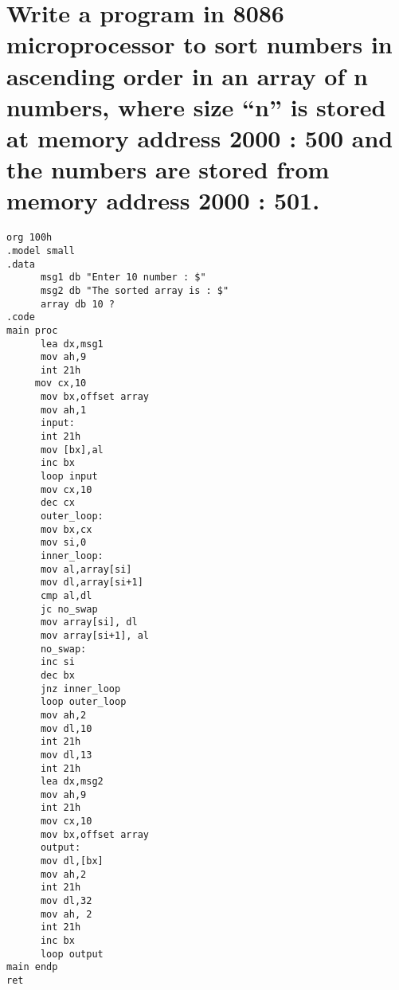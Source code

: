 \documentclass{article}
\begin{document}
\section{Write a program in 8086 microprocessor to sort numbers in ascending order in an
array of n numbers, where size “n” is stored at memory address 2000 : 500 and
the numbers are stored from memory address 2000 : 501.} 

\begin{lstlisting}[style=asmStyle]
org 100h
.model small
.data
      msg1 db "Enter 10 number : $" 
      msg2 db "The sorted array is : $" 
      array db 10 ?
.code
main proc
      lea dx,msg1
      mov ah,9
      int 21h
     mov cx,10
      mov bx,offset array
      mov ah,1
      input:
      int 21h
      mov [bx],al
      inc bx
      loop input
      mov cx,10
      dec cx
      outer_loop:
      mov bx,cx
      mov si,0    
      inner_loop:
      mov al,array[si]
      mov dl,array[si+1]   
      cmp al,dl
      jc no_swap
      mov array[si], dl
      mov array[si+1], al
      no_swap: 
      inc si
      dec bx
      jnz inner_loop
      loop outer_loop
      mov ah,2
      mov dl,10
      int 21h
      mov dl,13
      int 21h
      lea dx,msg2
      mov ah,9
      int 21h
      mov cx,10
      mov bx,offset array
      output:
      mov dl,[bx]
      mov ah,2
      int 21h
      mov dl,32
      mov ah, 2
      int 21h
      inc bx
      loop output
main endp 
ret
\end{lstlisting}




% 
% 
\end{document}
